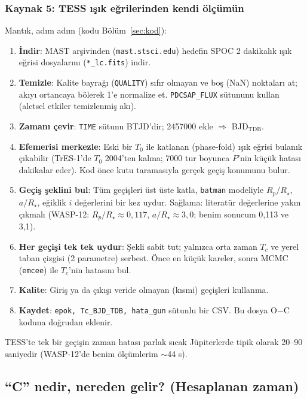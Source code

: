 \subsubsection*{Kaynak 5: TESS ışık eğrilerinden kendi ölçümün}
Mantık, adım adım (kodu Bölüm~\ref{sec:kod}):
\begin{enumerate}[leftmargin=*]
\item \textbf{İndir}: MAST arşivinden (\texttt{mast.stsci.edu}) hedefin SPOC 2 dakikalık ışık eğrisi dosyalarını
      (\texttt{*\_lc.fits}) indir.
\item \textbf{Temizle}: Kalite bayrağı (\texttt{QUALITY}) sıfır olmayan ve boş (NaN) noktaları at; akıyı ortancaya
      bölerek 1'e normalize et. \texttt{PDCSAP\_FLUX} sütununu kullan (aletsel etkiler temizlenmiş akı).
\item \textbf{Zamanı çevir}: \texttt{TIME} sütunu BTJD'dir; 2457000 ekle $\Rightarrow$ BJD$_\mathrm{TDB}$.
\item \textbf{Efemerisi merkezle}: Eski bir $T_0$ ile katlanan (phase-fold) ışık eğrisi bulanık çıkabilir
      (TrES-1'de $T_0$ 2004'ten kalma; 7000 tur boyunca $P$'nin küçük hatası dakikalar eder). Kod önce kutu
      taramasıyla gerçek geçiş konumunu bulur.
\item \textbf{Geçiş şeklini bul}: Tüm geçişleri üst üste katla, \texttt{batman} modeliyle $R_p/R_\star$, $a/R_\star$,
      eğiklik $i$ değerlerini bir kez uydur. Sağlama: literatür değerlerine yakın çıkmalı (WASP-12: $R_p/R_\star \approx 0{,}117$,
      $a/R_\star \approx 3{,}0$; benim sonucum 0,113 ve 3,1).
\item \textbf{Her geçişi tek tek uydur}: Şekli sabit tut; yalnızca orta zaman $T_c$ ve yerel taban çizgisi
      (2 parametre) serbest. Önce en küçük kareler, sonra MCMC (\texttt{emcee}) ile $T_c$'nin hatasını bul.
\item \textbf{Kalite}: Giriş ya da çıkışı veride olmayan (kısmi) geçişleri kullanma.
\item \textbf{Kaydet}: \texttt{epok, Tc\_BJD\_TDB, hata\_gun} sütunlu bir CSV. Bu dosya O$-$C koduna doğrudan eklenir.
\end{enumerate}
TESS'te tek bir geçişin zaman hatası parlak sıcak Jüpiterlerde tipik olarak 20–90 saniyedir
(WASP-12'de benim ölçümlerim $\sim$44 s).

\subsection{“C” nedir, nereden gelir? (Hesaplanan zaman)}

